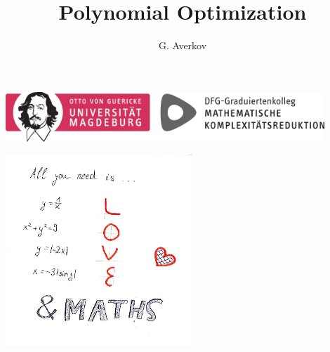 \documentclass[a4paper,11pt]{article}
\title{\Huge Polynomial Optimization}
\author{\Large G. Averkov}
\numberwithin{equation}{section}
\begin{document}

\maketitle

\hspace{3ex}

	\begin{center}
		\includegraphics[width=12cm]{logoCoreOVGUText.png}
	\end{center}

\hspace{3ex}


\begin{framed}
\begin{center}
\includegraphics[width=7cm]{love_maths.png}
\end{center}
\end{framed}


\clearpage

\tableofcontents

\clearpage


\clearpage 


\clearpage


\clearpage 


\clearpage 



\clearpage


\clearpage





%
\end{document}
